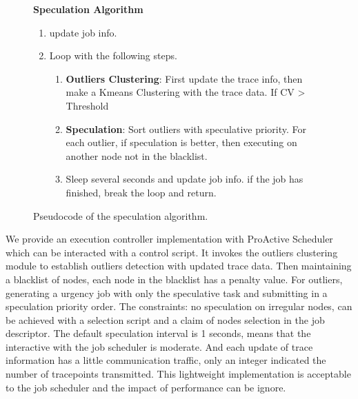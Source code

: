  \begin{figure}
\textbf{Speculation Algorithm}
\begin{enumerate}[(1)]
\setlength{\itemsep}{-\itemsep}
\item update job info.
\item Loop with the following steps.
\begin{enumerate}[]
\setlength{\itemsep}{-\itemsep}
\item \textbf{Outliers Clustering}: First update the trace info, then make a Kmeans Clustering with the trace data. If CV > Threshold
\item \textbf{Speculation}: Sort outliers with speculative priority. For each outlier, if speculation is better, then executing on another node not in the blacklist.
\item Sleep several seconds and update job info. if the job has finished, break the loop and return.
\end{enumerate}
\end{enumerate}
\caption{Pseudocode of the speculation algorithm.}
\label{fig-spec-algo}
\end{figure}

We provide an execution controller implementation with ProActive Scheduler which can be interacted with  a control script. It invokes the outliers clustering module to establish outliers detection with updated trace data. Then maintaining a blacklist of nodes, each node in the blacklist has a penalty value. For outliers, generating a urgency job with only the speculative task and submitting in a speculation priority order. The constraints: no speculation on irregular nodes, can be achieved with a selection script and a claim of nodes selection in the job descriptor. The default speculation interval is 1 seconds, means that the interactive with the job scheduler is moderate. And each update of trace information has a little communication traffic, only an integer indicated the number of  tracepoints transmitted. This lightweight implementation is acceptable to the job scheduler and the impact of performance can be ignore.
